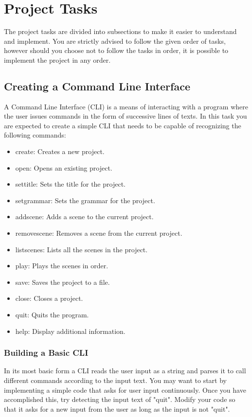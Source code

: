 \documentclass[a4paper]{article}
\begin{document}
	\section{Project Tasks}
	\label{tasks}
	The project tasks are divided into subsections to make it easier to understand and implement. You are strictly advised to follow the given order of tasks, however should you choose not to follow the tasks in order, it is possible to implement the project in any order.
	
	\subsection{Creating a Command Line Interface}
	A Command Line Interface (CLI) is a means of interacting with a program where the user issues commands in the form of successive lines of texts. In this task you are expected to create a simple CLI that needs to be capable of recognizing the following commands:
	\label{commands}
	\begin{itemize}
		\item create: Creates a new project.
		\item open: Opens an existing project.
		\item settitle: Sets the title for the project.
		\item setgrammar: Sets the grammar for the project.
		\item addscene: Adds a scene to the current project.
		\item removescene: Removes a scene from the current project.
		\item listscenes: Lists all the scenes in the project.
		\item play: Plays the scenes in order.
		\item save: Saves the project to a file.
		\item close: Closes a project.
		\item quit: Quits the program.
		\item help: Display additional information.
	\end{itemize}
	
	\subsubsection{Building a Basic CLI}
	
	In its most basic form a CLI reads the user input as a string and parses it to call different commands according to the input text. You may want to start by implementing a simple code that asks for user input continuously. Once you have accomplished this, try detecting the input text of "quit". Modify your code so that it asks for a new input from the user as long as the input is not "quit". \\
\end{document}

